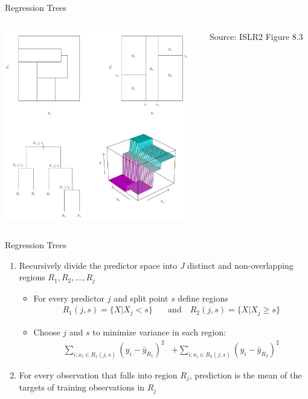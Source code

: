 \documentclass[ignorenonframetext,xcolor=x11names]{beamer}
\begin{document}
\begin{frame}{Regression Trees}
\begin{columns}
\begin{column}{.8\textwidth}
\includegraphics[height=3.25in]{../class11/Figures_Chapters_7-13/Chapter8/8_3.pdf} 
\end{column}
\begin{column}{.2\textwidth}
\scriptsize Source: ISLR2 Figure 8.3
\end{column}
\end{columns}
\end{frame}

\begin{frame}{Regression Trees}
\begin{enumerate}
   \item Recursively divide the predictor space into $J$ distinct and non-overlapping regions $R_1, R_2, \ldots, R_j$
   \begin{itemize}
   \vspace{\baselineskip}
       \item For every predictor $j$ and split point $s$ define regions
       \begin{align*}
       R_1(j,s) = \{X | X_j < s\} \quad &\text{and} \quad R_2(j, s) = \{X | X_j \geq s\}
       \end{align*}
       \item Choose $j$ and $s$ to minimize variance in each region:
       \begin{align*}
       \sum_{i: x_i \in R_1(j,s)} (y_i - \bar{y}_{R_1})^2 &+ \sum_{i: x_i \in R_2(j,s)} (y_i - \bar{y}_{R_2})^2
       \end{align*}
   \end{itemize}
   \item For every observation that falls into region $R_j$, prediction is the mean of the targets of training observations in $R_j$
\end{enumerate}
\end{frame}
\end{document}
